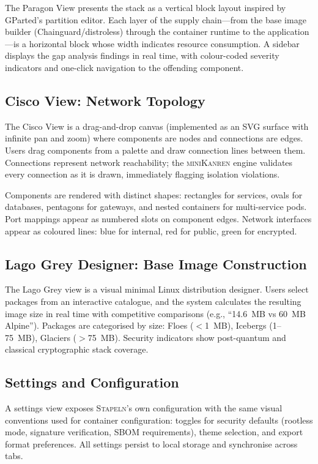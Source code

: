 \documentclass[11pt,twocolumn]{article}
\newcommand{\stapeln}{\textsc{Stapeln}\xspace}
\newcommand{\minikanren}{\textsc{miniKanren}\xspace}
\begin{document}
The Paragon View presents the stack as a vertical block layout
inspired by GParted's partition editor. Each layer of the supply
chain---from the base image builder (Chainguard/distroless) through
the container runtime to the application---is a horizontal block whose
width indicates resource consumption. A sidebar displays the gap
analysis findings in real time, with colour-coded severity indicators
and one-click navigation to the offending component.

\subsection{Cisco View: Network Topology}
\label{sec:visual-cisco}

The Cisco View is a drag-and-drop canvas (implemented as an SVG
surface with infinite pan and zoom) where components are nodes and
connections are edges. Users drag components from a palette and draw
connection lines between them. Connections represent network
reachability; the \minikanren engine validates every connection as it
is drawn, immediately flagging isolation violations.

Components are rendered with distinct shapes: rectangles for services,
ovals for databases, pentagons for gateways, and nested containers
for multi-service pods. Port mappings appear as numbered slots on
component edges. Network interfaces appear as coloured lines: blue
for internal, red for public, green for encrypted.

\subsection{Lago Grey Designer: Base Image Construction}
\label{sec:visual-lago}

The Lago Grey view is a visual minimal Linux distribution designer.
Users select packages from an interactive catalogue, and the system
calculates the resulting image size in real time with competitive
comparisons (e.g., ``14.6~MB vs 60~MB Alpine''). Packages are
categorised by size: Floes ($<$1~MB), Icebergs (1--75~MB), Glaciers
($>$75~MB). Security indicators show post-quantum and classical
cryptographic stack coverage.

\subsection{Settings and Configuration}
\label{sec:visual-settings}

A settings view exposes \stapeln's own configuration with the same
visual conventions used for container configuration: toggles for
security defaults (rootless mode, signature verification, SBOM
requirements), theme selection, and export format preferences. All
settings persist to local storage and synchronise across tabs.
\end{document}
